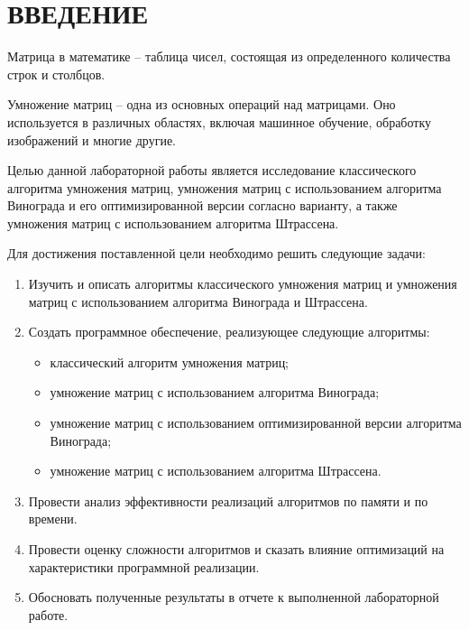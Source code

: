 \chapter*{ВВЕДЕНИЕ}

Матрица в математике -- таблица чисел, состоящая из определенного количества строк и столбцов.

Умножение матриц -- одна из основных операций над матрицами. Оно используется в различных областях, включая машинное обучение, обработку изображений и многие другие.

Целью данной лабораторной работы является исследование классического алгоритма умножения матриц, умножения матриц с использованием алгоритма Винограда и его оптимизированной версии согласно варианту, а также умножения матриц с использованием алгоритма Штрассена.

Для достижения поставленной цели необходимо решить следующие задачи:

\begin{enumerate}[label={\arabic*)}]
	\item Изучить и описать алгоритмы классического умножения матриц и умножения матриц с использованием алгоритма Винограда и Штрассена.
	\item Создать программное обеспечение, реализующее следующие алгоритмы:
	\begin{itemize}[label=--]
		\item классический алгоритм умножения матриц;
		\item умножение матриц с использованием алгоритма Винограда;
		\item умножение матриц с использованием оптимизированной версии алгоритма Винограда;
		\item умножение матриц с использованием алгоритма Штрассена.
	\end{itemize}

	\item Провести анализ эффективности реализаций алгоритмов по памяти и по времени.
	\item Провести оценку сложности алгоритмов и сказать влияние оптимизаций на характеристики программной реализации.
	\item Обосновать полученные результаты в отчете к выполненной лабораторной работе.
\end{enumerate}
